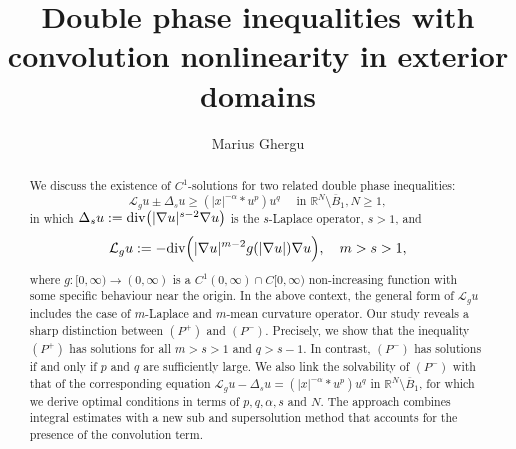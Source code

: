 \documentclass[leqno,12pt]{article}
\numberwithin{equation}{section}
\begin{document}
\title{\vskip-0.3in Double phase inequalities with convolution nonlinearity in exterior domains} 

\author[ ]{Marius Ghergu}



\maketitle

\begin{abstract} 
We discuss the existence of $C^1$-solutions for two related double phase inequalities:
\begin{equation*}
{\mathcal L}_g u\pm \Delta_s u\geq (|x|^{-\alpha}*u^p)u^q \quad\mbox{ in }\mathbb R^N\setminus \overline B_1, N\geq 1,\tag{$P^\pm$}
\end{equation*}
in which $\Delta_s u:={\rm div}\big(|\nabla u|^{s-2}\nabla u\big)$ is the $s$-Laplace operator, $s>1$, and
$$
{\mathcal L}_g u:= -{\rm div}\Big(|\nabla u|^{m-2}g(|\nabla u|)\nabla u\Big),\quad m>s>1,
$$
where $g:[0, \infty)\to (0, \infty)$ is a $C^1(0, \infty)\cap C[0, \infty)$  non-increasing function with some specific behaviour near the origin. In the above context, the general form of ${\mathcal L}_g u$ includes the case of $m$-Laplace and $m$-mean curvature operator.
Our study reveals a sharp distinction between $(P^+)$ and $(P^-)$. Precisely, we show that the inequality $(P^+)$ has solutions for all $m>s>1$ and $q>s-1$. In contrast, $(P^-)$ has solutions if and only if $p$ and $q$ are sufficiently large. We also link the solvability of $(P^-)$ with that of the corresponding equation ${\mathcal L}_g u- \Delta_s u= (|x|^{-\alpha}*u^p)u^q$  in $\mathbb R^N\setminus \overline B_1$, for which we derive optimal conditions in terms of $p, q, \alpha, s$ and $N$.
The approach combines integral estimates with a new sub and supersolution method that accounts for the presence of the convolution term.  
\end{abstract}



\medskip
\end{document}
